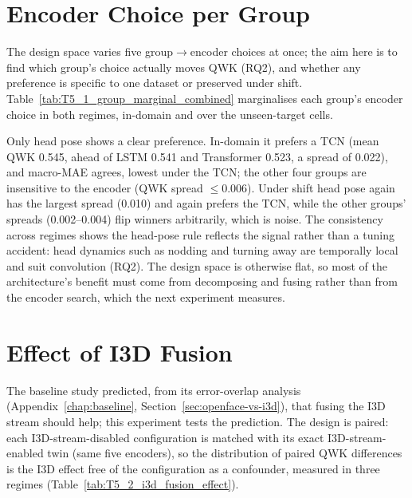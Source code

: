 \documentclass[../main.tex]{subfiles}
\begin{document}
\FloatBarrier
\section{Encoder Choice per Group}
\label{sec:group-marginal}

The design space varies five group$\rightarrow$encoder choices at once; the aim here is to find which group's choice actually moves QWK (RQ2), and whether any preference is specific to one dataset or preserved under shift. Table~\ref{tab:T5_1_group_marginal_combined} marginalises each group's encoder choice in both regimes, in-domain and over the unseen-target cells.


Only head pose shows a clear preference. In-domain it prefers a TCN (mean QWK 0.545, ahead of LSTM 0.541 and Transformer 0.523, a spread of 0.022), and macro-MAE agrees, lowest under the TCN; the other four groups are insensitive to the encoder (QWK spread $\le0.006$). Under shift head pose again has the largest spread (0.010) and again prefers the TCN, while the other groups' spreads (0.002--0.004) flip winners arbitrarily, which is noise. The consistency across regimes shows the head-pose rule reflects the signal rather than a tuning accident: head dynamics such as nodding and turning away are temporally local and suit convolution (RQ2). The design space is otherwise flat, so most of the architecture's benefit must come from decomposing and fusing rather than from the encoder search, which the next experiment measures.

\FloatBarrier
\section{Effect of I3D Fusion}
\label{sec:i3d-effect}

The baseline study predicted, from its error-overlap analysis (Appendix~\ref{chap:baseline}, Section~\ref{sec:openface-vs-i3d}), that fusing the I3D stream should help; this experiment tests the prediction. The design is paired: each I3D-stream-disabled configuration is matched with its exact I3D-stream-enabled twin (same five encoders), so the distribution of paired QWK differences is the I3D effect free of the configuration as a confounder, measured in three regimes (Table~\ref{tab:T5_2_i3d_fusion_effect}).

\end{document}
